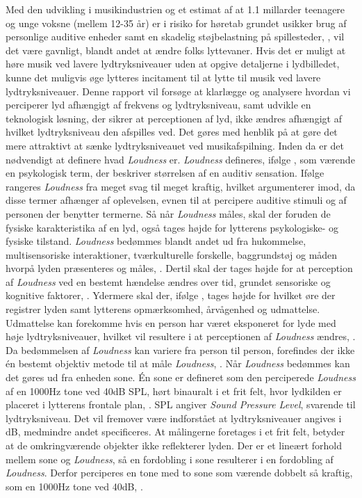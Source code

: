 \blankline
Med den udvikling i musikindustrien og et estimat af at 1.1 millarder teenagere og unge voksne (mellem 12-35 år) er i risiko for høretab grundet usikker brug af personlige auditive enheder samt en skadelig støjbelastning på spillesteder, \parencite{WEB:WHOHearingLoss}, vil det være gavnligt, blandt andet at ændre folks lyttevaner. Hvis det er muligt at høre musik ved lavere lydtryksniveauer uden at opgive detaljerne i lydbilledet, kunne det muligvis øge lytteres incitament til at lytte til musik ved lavere lydtryksniveauer. 
\blankline
Denne rapport vil forsøge at klarlægge og analysere hvordan vi perciperer lyd afhængigt af frekvens og lydtryksniveau, samt udvikle en teknologisk løsning, der sikrer at perceptionen af lyd, ikke ændres afhængigt af hvilket lydtryksniveau den afspilles ved. Det gøres med henblik på at gøre det mere attraktivt at sænke lydtryksniveauet ved musikafspilning. Inden da er det nødvendigt at definere hvad \textit{Loudness} er.
\blankline
\textit{Loudness} defineres, ifølge \textcite[s. 82]{PDF:FletcherMunson}, som værende en psykologisk term, der beskriver størrelsen af en auditiv sensation. Ifølge \textcite[s. 3]{BOOK:Loudness} rangeres \textit{Loudness} fra meget svag til meget kraftig, hvilket \textcite[s. 82]{PDF:FletcherMunson} argumenterer imod, da disse termer afhænger af oplevelsen, evnen til at percipere auditive stimuli og af personen der benytter termerne. Så når \textit{Loudness} måles, skal der foruden de fysiske karakteristika af en lyd, også tages højde for lytterens psykologiske- og fysiske tilstand. \textit{Loudness} bedømmes blandt andet ud fra hukommelse, multisensoriske interaktioner, tværkulturelle forskelle, baggrundstøj og måden hvorpå lyden præsenteres og måles, \parencite[ss. 4-5]{BOOK:Loudness}. Dertil skal der tages højde for at perception af \textit{Loudness} ved en bestemt hændelse ændres over tid, grundet sensoriske og kognitive faktorer, \parencite[s. 5]{BOOK:Loudness}. Ydermere skal der, ifølge \textcite[s. 82]{PDF:FletcherMunson}, tages højde for hvilket øre der registrer lyden samt lytterens opmærksomhed, årvågenhed og udmattelse. Udmattelse kan forekomme hvis en person har været eksponeret for lyde med høje lydtryksniveauer, hvilket vil resultere i at perceptionen af \textit{Loudness} ændres, \parencite[s. 6]{BOOK:Loudness}. Da bedømmelsen af \textit{Loudness} kan variere fra person til person, forefindes der ikke én bestemt objektiv metode til at måle \textit{Loudness}, \parencite[s. 4]{BOOK:Loudness}.
\blankline
Når \textit{Loudness} bedømmes kan det gøres ud fra enheden sone. Én sone er defineret som den perciperede \textit{Loudness} af en 1000Hz tone ved 40dB SPL, hørt binauralt i et frit felt, hvor lydkilden er placeret i lytterens frontale plan, \parencite[s. 4]{BOOK:Loudness}. SPL angiver \textit{Sound Pressure Level}, svarende til lydtryksniveau. Det vil fremover være indforstået at lydtryksniveauer angives i dB, medmindre andet specificeres. At målingerne foretages i et frit felt, betyder at de omkringværende objekter ikke reflekterer lyden. Der er et lineært forhold mellem sone og \textit{Loudness}, så en fordobling i sone resulterer i en fordobling af \textit{Loudness}. Derfor perciperes en tone med to sone som værende dobbelt så kraftig, som en 1000Hz tone ved 40dB, \parencite[s. 4]{BOOK:Loudness}.
